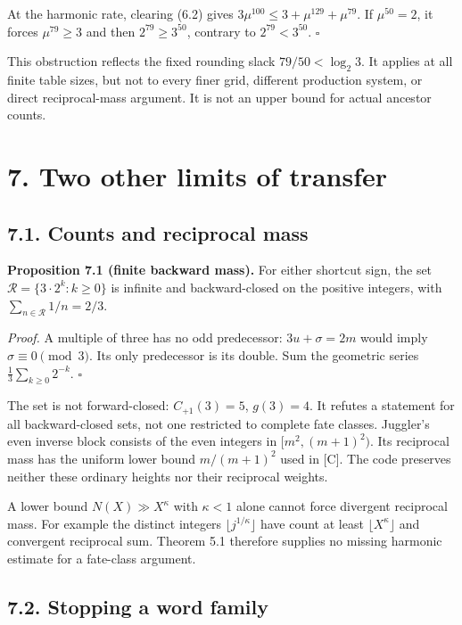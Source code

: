 \documentclass[11pt,a4paper]{article}
\begin{document}
At the harmonic rate, clearing (6.2) gives
\(3\mu^{100}\le3+\mu^{129}+\mu^{79}\). If \(\mu^{50}=2\), it forces
\(\mu^{79}\ge3\) and then \(2^{79}\ge3^{50}\), contrary to
\(2^{79}<3^{50}\). \(\square\)

This obstruction reflects the fixed rounding slack \(79/50<\log_2 3\).
It applies at all finite table sizes, but not to every finer grid,
different production system, or direct reciprocal-mass argument. It is
not an upper bound for actual ancestor counts.

\section{7. Two other limits of
transfer}\label{two-other-limits-of-transfer}

\subsection{7.1. Counts and reciprocal
mass}\label{counts-and-reciprocal-mass}

\textbf{Proposition 7.1 (finite backward mass).} For either shortcut
sign, the set \(\mathcal R=\{3\cdot2^k:k\ge0\}\) is infinite and
backward-closed on the positive integers, with
\(\sum_{n\in\mathcal R}1/n=2/3\).

\emph{Proof.} A multiple of three has no odd predecessor:
\(3u+\sigma=2m\) would imply \(\sigma\equiv0\pmod3\). Its only
predecessor is its double. Sum the geometric series
\(\frac13\sum_{k\ge0}2^{-k}\). \(\square\)

The set is not forward-closed: \(C_{+1}(3)=5\), \(g(3)=4\). It refutes a
statement for all backward-closed sets, not one restricted to complete
fate classes. Juggler's even inverse block consists of the even integers
in \([m^2,(m+1)^2)\). Its reciprocal mass has the uniform lower bound
\(m/(m+1)^2\) used in {[}C{]}. The code preserves neither these ordinary
heights nor their reciprocal weights.

A lower bound \(N(X)\gg X^\kappa\) with \(\kappa<1\) alone cannot force
divergent reciprocal mass. For example the distinct integers
\(\lfloor j^{1/\kappa}\rfloor\) have count at least
\(\lfloor X^\kappa\rfloor\) and convergent reciprocal sum. Theorem 5.1
therefore supplies no missing harmonic estimate for a fate-class
argument.

\subsection{7.2. Stopping a word family}\label{stopping-a-word-family}
\end{document}
